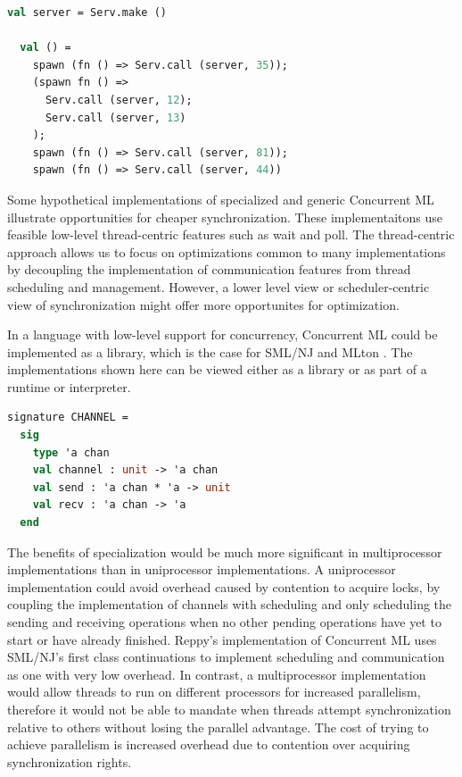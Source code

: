 \documentclass[letterpaper, 11pt]{report}
\begin{document}
\begin{lstlisting}[language=ML, mathescape]
  val server = Serv.make ()

  val () =
    spawn (fn () => Serv.call (server, 35));
    (spawn fn () => 
      Serv.call (server, 12); 
      Serv.call (server, 13)
    );
    spawn (fn () => Serv.call (server, 81));
    spawn (fn () => Serv.call (server, 44))
\end{lstlisting}

Some hypothetical implementations of specialized and generic
Concurrent ML illustrate opportunities
for cheaper synchronization. These implementaitons use 
feasible low-level thread-centric features such as wait and poll. The thread-centric approach
allows us to focus on optimizations common to many implementations by decoupling the
implementation of communication features from thread scheduling and management. However, a
lower level view or scheduler-centric view of synchronization might offer more opportunites
for optimization.

In a language with low-level support for concurrency,
Concurrent ML could be implemented as a library,
which is the case for SML/NJ \cite{smlnj} and MLton \cite{mlton}.
The implementations shown here can be viewed either as a library or as part of
a runtime or interpreter.

\begin{lstlisting}[language=ML, mathescape]
  signature CHANNEL =
  sig
    type 'a chan 
    val channel : unit -> 'a chan
    val send : 'a chan * 'a -> unit
    val recv : 'a chan -> 'a
  end     
\end{lstlisting}

The benefits of specialization would be much more significant in multiprocessor
implementations than in uniprocessor implementations. A uniprocessor
implementation could avoid overhead caused by contention to acquire locks, by coupling the
implementation of channels with scheduling and only scheduling the sending and receiving
operations when no other pending operations have yet to start or have already finished.
Reppy's implementation of
Concurrent ML uses SML/NJ's first class continuations to implement scheduling and communication
as one with very low overhead. In contrast, a multiprocessor
implementation would allow threads to run
on different processors for increased parallelism,
therefore it would not be able to mandate when
threads attempt synchronization relative to others without losing the parallel advantage.
The cost of trying to achieve parallelism
is increased overhead due to contention over acquiring
synchronization rights. 
\end{document}
